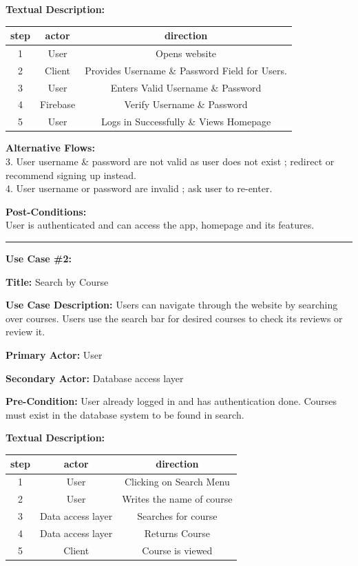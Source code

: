 \documentclass{article}
\begin{document}
\quad\textbf{Textual Description:} 

\begin{center}
  \begin{tabular}{|c|c|c|} 
    \hline
    step & actor & direction \\  \hline
    1&User&Opens website \\ 
    2 & 
    Client & 
Provides Username \& Password Field for Users. \\
    3 & 
    User & 
Enters Valid Username \& Password \\
    4 & 
    Firebase & 
    Verify Username \& Password  \\
    5 &
    User &
    Logs in Successfully \& Views Homepage \\ \hline

  \end{tabular}
\end{center}


\textbf{Alternative Flows:}\\
3. User username \& password are not valid as user does not exist ; redirect or recommend signing up instead.\\
4. User username or password are invalid ; ask user to re-enter.

\textbf{Post-Conditions: }\\
User is authenticated and can access the app, homepage and its features. \\

\hrule

\textbf{Use Case \#2: }

\quad\textbf{Title:} Search by Course

\quad\textbf{Use Case Description:}
Users can navigate through the website by searching over courses.  Users use the search bar for desired courses to check its reviews or review it.

\quad\textbf{Primary Actor:} User

\quad\textbf{Secondary Actor:} Database access layer

\quad\textbf{Pre-Condition:} User already logged in and has authentication done. Courses must exist in the database system to be found in search.

\quad\textbf{Textual Description:}


\begin{center}
  \begin{tabular}{|c|c|c|} 
    \hline
    step & actor & direction \\  \hline

    1 & 
    User&
Clicking on Search Menu \\
    2 & 
    User & 
Writes the name of course \\
    3 & 
    Data access layer &
Searches for course \\
    4 & 
    Data access layer &
Returns Course \\
    5 & 
    Client  &
Course is viewed \\ \hline

  \end{tabular}
\end{center}
\end{document}
